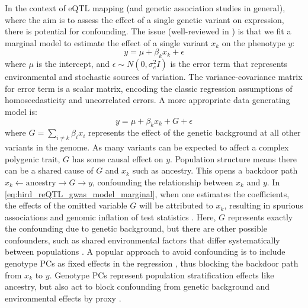 In the context of \gls{eQTL} mapping (and genetic association studies in general), 
where the aim is to assess the effect of a single genetic variant on expression, 
there is potential for confounding.
The issue (well-reviewed in \autocite{sul2018PopulationStructureGenetic,golan2018MixedModelsCaseControl}) is that we fit a marginal model to estimate the effect of a single variant $x_k$ on the phenotype $y$:
\begin{equation}
    y = \mu + \beta_k x_k + \epsilon
    \label{eq:hird_reQTL_gwas_model_marginal}
\end{equation}
where $\mu$ is the intercept,
and $\epsilon \sim N(0, \sigma_e^2 I)$ is the error term that represents environmental and stochastic sources of variation.
The variance-covariance matrix for error term is a scalar matrix, 
encoding the classic regression assumptions of homoscedasticity and uncorrelated errors.
A more appropriate data generating model is:
\begin{equation}
    y = \mu + \beta_k x_k + G + \epsilon
    \label{eq:hird_reQTL_gwas_model_full}
\end{equation}
where $G = \sum_{i \neq k}{\beta_i x_i}$ represents the effect of the genetic background at all other variants in the genome.
As many variants can be expected to affect a complex polygenic trait, $G$ has some causal effect on $y$.
Population structure means there can be a shared cause of $G$ and $x_k$ such as ancestry.
This opens a backdoor path $x_k \leftarrow \text{ancestry} \rightarrow G \rightarrow y$,
confounding the relationship between $x_k$ and $y$.
In \cref{eq:hird_reQTL_gwas_model_marginal},
when one estimates the coefficients,
the effects of the omitted variable $G$ will be attributed to $x_k$,
resulting in spurious associations and genomic inflation of test statistics \autocite{price2010NewApproachesPopulation}.
Here, $G$ represents exactly the confounding due to genetic background,
but there are other possible confounders,
such as shared environmental factors that differ systematically between populations \autocite{vilhjalmsson2013NatureConfoundingGenomewide}.
A popular approach to avoid confounding is to include genotype \glspl{PC} as fixed effects in the regression \autocite{price2006PrincipalComponentsAnalysis,eu-ahsunthornwattana2014ComparisonMethodsAccount},
thus blocking the backdoor path from $x_k$ to $y$.
Genotype \glspl{PC} represent population stratification effects like ancestry, 
but also act to block confounding from genetic background and environmental effects by proxy \autocite{vilhjalmsson2013NatureConfoundingGenomewide}.

